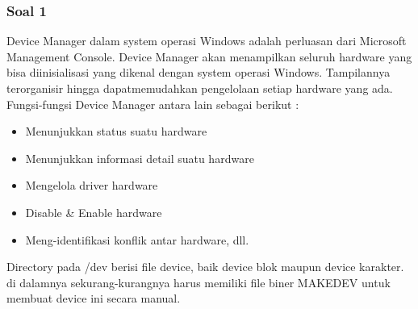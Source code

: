 \subsubsection{Soal 1}
Device Manager dalam system operasi Windows adalah perluasan dari Microsoft Management Console. Device Manager akan menampilkan seluruh hardware yang bisa diinisialisasi yang dikenal dengan system operasi Windows. Tampilannya terorganisir hingga dapatmemudahkan pengelolaan setiap hardware yang ada.
Fungsi-fungsi Device Manager antara lain sebagai berikut :
\begin{itemize}
\item Menunjukkan status suatu hardware
\item Menunjukkan informasi detail suatu hardware
\item Mengelola driver hardware
\item Disable \& Enable hardware
\item Meng-identifikasi konflik antar hardware, dll.
\end{itemize}
Directory pada /dev berisi file device, baik device blok maupun device karakter. di dalamnya sekurang-kurangnya  harus memiliki file biner MAKEDEV untuk membuat device ini secara manual.

